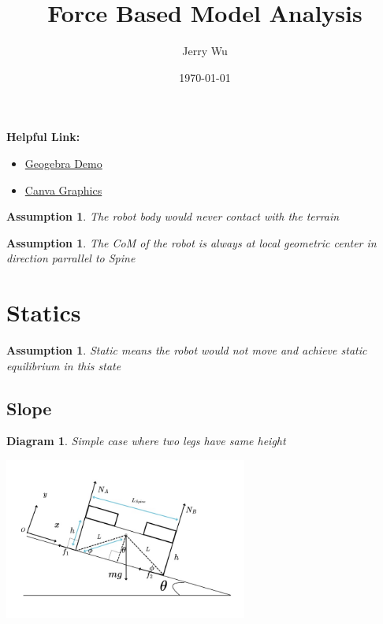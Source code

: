 \documentclass[11pt]{article}
\title{\textbf{Force Based Model Analysis}}
\author{Jerry Wu}
\date{\today}
\newtheorem{assumption}[statement]{Assumption}
\newtheorem{diagram}[statement]{Diagram}
\begin{document}
\maketitle
\noindent
\textbf{Helpful Link:}
\begin{itemize}
    \item \href{https://www.geogebra.org/classic/vzgc97bq}{Geogebra Demo}
    \item \href{https://www.canva.com/design/DAGo-OCr6Yo/K5YV57vaBxux-PqkqwI4ow/edit?utm_content=DAGo-OCr6Yo&utm_campaign=designshare&utm_medium=link2&utm_source=sharebutton}{Canva Graphics}
\end{itemize}


\begin{assumption}\label{ass: no-body-contact}
The robot body would never contact with the terrain
\end{assumption}

\begin{assumption}\label{ass: com}
The CoM of the robot is always at local geometric center in direction parrallel to Spine
\end{assumption}

\section{Statics}
\begin{assumption}
Static means the robot would not move and achieve static equilibrium in this state
\end{assumption}
\subsection*{Slope}

\begin{diagram}
    Simple case where two legs have same height
\end{diagram}\label{ass:h2-equal-h1}
\vspace{1ex} %
\begin{center}
    \includegraphics[width=0.6\textwidth]{figs/Simple case where two legs have same height.jpg} %
\end{center}
\end{document}
